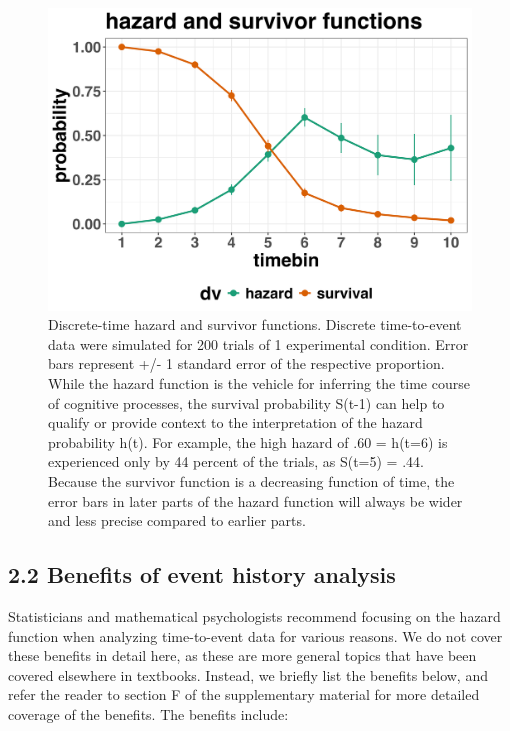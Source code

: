 \documentclass[
  man, donotrepeattitle,floatsintext]{apa6}
\begin{document}
\begin{figure}[H]

{\centering \includegraphics[width=0.8\linewidth,height=0.67\textheight,]{../sims/figures/haz_surv_single} 

}

\caption{Discrete-time hazard and survivor functions. Discrete time-to-event data were simulated for 200 trials of 1 experimental condition. Error bars represent +/- 1 standard error of the respective proportion. While the hazard function is the vehicle for inferring the time course of cognitive processes, the survival probability S(t-1) can help to qualify or provide context to the interpretation of the hazard probability h(t). For example, the high hazard of .60 = h(t=6) is experienced only by 44 percent of the trials, as S(t=5) = .44.
Because the survivor function is a decreasing function of time, the error bars in later parts of the hazard function will always be wider and less precise compared to earlier parts.}\label{fig:plot2}
\end{figure}

\subsection{2.2 Benefits of event history analysis}\label{benefits-of-event-history-analysis}

Statisticians and mathematical psychologists recommend focusing on the hazard function when analyzing time-to-event data for various reasons. We do not cover these benefits in detail here, as these are more general topics that have been covered elsewhere in textbooks. Instead, we briefly list the benefits below, and refer the reader to section F of the supplementary material for more detailed coverage of the benefits. The benefits include:
\end{document}
